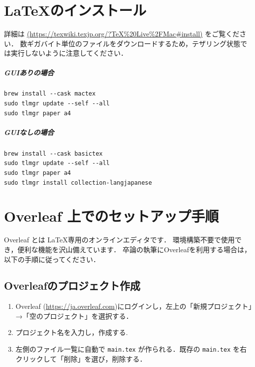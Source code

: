 \documentclass[jlreq,12pt,twoside]{jsreport}
\begin{document}
\chapter{\LaTeX のインストール}

詳細は \url{(https://texwiki.texjp.org/?TeX%20Live%2FMac#install)} をご覧ください．
数ギガバイト単位のファイルをダウンロードするため，テザリング状態では実行しないように注意してください．

\paragraph{GUIありの場合}

\begin{lstlisting}[caption=hoge,label=fuga]
brew install --cask mactex
sudo tlmgr update --self --all
sudo tlmgr paper a4
\end{lstlisting}

\paragraph{GUIなしの場合}

\begin{lstlisting}[caption=hoge,label=fuga]
brew install --cask basictex
sudo tlmgr update --self --all
sudo tlmgr paper a4
sudo tlmgr install collection-langjapanese
\end{lstlisting}

\chapter{Overleaf 上でのセットアップ手順}

Overleaf とは \LaTeX 専用のオンラインエディタです． 環境構築不要で使用でき，便利な機能を沢山備えています．
卒論の執筆にOverleafを利用する場合は，以下の手順に従ってください．

\section{Overleafのプロジェクト作成}

\begin{enumerate}
  \item Overleaf (\url{https://ja.overleaf.com})にログインし，左上の「新規プロジェクト」→「空のプロジェクト」を選択する．
  \item プロジェクト名を入力し，作成する.
  \item 左側のファイル一覧に自動で \texttt{main.tex} が作られる．既存の \texttt{main.tex} を右クリックして「削除」を選び，削除する．
\end{enumerate}
\end{document}
